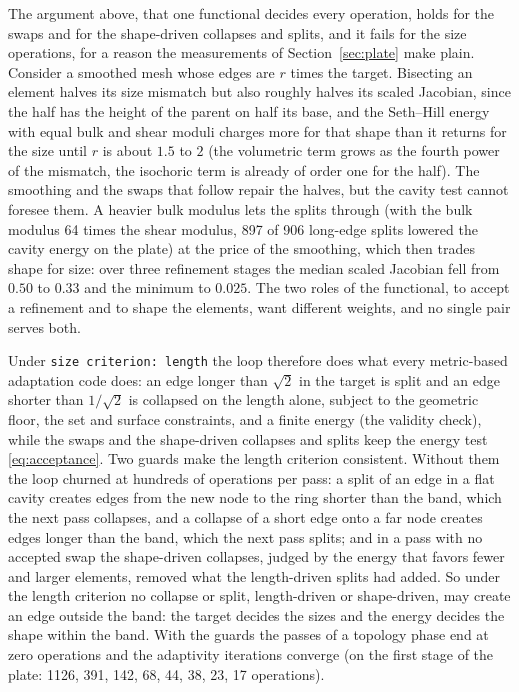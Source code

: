 \documentclass[11pt]{article}
\newcommand{\code}[1]{\texttt{#1}}
\begin{document}
The argument above, that one functional decides every operation, holds
for the swaps and for the shape-driven collapses and splits, and it
fails for the size operations, for a reason the measurements of
Section~\ref{sec:plate} make plain. Consider a smoothed mesh whose
edges are $r$ times the target. Bisecting an element halves its size
mismatch but also roughly halves its scaled Jacobian, since the half has
the height of the parent on half its base, and the Seth--Hill energy
with equal bulk and shear moduli charges more for that shape than it
returns for the size until $r$ is about $1.5$ to $2$ (the volumetric
term grows as the fourth power of the mismatch, the isochoric term is
already of order one for the half). The smoothing and the swaps that
follow repair the halves, but the cavity test cannot foresee them. A
heavier bulk modulus lets the splits through (with the bulk modulus 64
times the shear modulus, 897 of 906 long-edge splits lowered the cavity
energy on the plate) at the price of the smoothing, which then trades
shape for size: over three refinement stages the median scaled
Jacobian fell from $0.50$ to $0.33$ and the minimum to $0.025$. The two
roles of the functional, to accept a refinement and to shape the
elements, want different weights, and no single pair serves both.

Under \code{size criterion: length} the loop therefore does what every
metric-based adaptation code does: an edge longer than $\sqrt2$ in the
target is split and an edge shorter than $1/\sqrt2$ is collapsed on the
length alone, subject to the geometric floor, the set and surface
constraints, and a finite energy (the validity check), while the swaps
and the shape-driven collapses and splits keep the energy test
\eqref{eq:acceptance}. Two guards make the length criterion consistent.
Without them the loop churned at hundreds of operations per pass: a
split of an edge in a flat cavity creates edges from the new node to the
ring shorter than the band, which the next pass collapses, and a
collapse of a short edge onto a far node creates edges longer than the
band, which the next pass splits; and in a pass with no accepted swap
the shape-driven collapses, judged by the energy that favors fewer and
larger elements, removed what the length-driven splits had added. So
under the length criterion no collapse or split, length-driven or
shape-driven, may create an edge outside the band: the target decides
the sizes and the energy decides the shape within the band. With the
guards the passes of a topology phase end at zero operations and the
adaptivity iterations converge (on the first stage of the plate: 1126,
391, 142, 68, 44, 38, 23, 17 operations).
\end{document}
